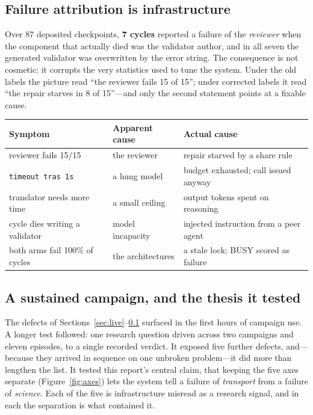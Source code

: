 \documentclass[11pt,a4paper]{article}
\newcommand{\code}[1]{\texttt{\small #1}}
\begin{document}
\subsection{Failure attribution is infrastructure}
\label{sec:attribution}

Over 87 deposited checkpoints, \textbf{7 cycles} reported a failure of the
\emph{reviewer} when the component that actually died was the validator author,
and in all seven the generated validator was overwritten by the error string.
The consequence is not cosmetic: it corrupts the very statistics used to tune
the system. Under the old labels the picture read ``the reviewer fails 15 of
15''; under corrected labels it read ``the repair starves in 8 of 15''---and
only the second statement points at a fixable cause.

\begin{center}
\small
\begin{tabular}{@{}p{4.5cm}p{4.6cm}p{4.9cm}@{}}
\toprule
\textbf{Symptom} & \textbf{Apparent cause} & \textbf{Actual cause} \\
\midrule
reviewer fails 15/15 & the reviewer & repair starved by a share rule \\
\code{timeout tras 1s} & a hung model & budget exhausted; call issued anyway \\
translator needs more time & a small ceiling & output tokens spent on reasoning \\
cycle dies writing a validator & model incapacity & injected instruction from a peer agent \\
both arms fail 100\% of cycles & the architectures & a stale lock; BUSY scored as failure \\
\bottomrule
\end{tabular}
\end{center}

\subsection{A sustained campaign, and the thesis it tested}
\label{sec:sustained}

The defects of Sections~\ref{sec:live}--\ref{sec:attribution} surfaced in the
first hours of campaign use. A longer test followed: one research question driven
across two campaigns and eleven episodes, to a single recorded verdict. It
exposed five further defects, and---because they arrived in sequence on one
unbroken problem---it did more than lengthen the list. It tested this report's
central claim, that keeping the five axes separate (Figure~\ref{fig:axes}) lets
the system tell a failure of \emph{transport} from a failure of \emph{science}.
Each of the five is infrastructure misread as a research signal, and in each the
separation is what contained it.
\end{document}
